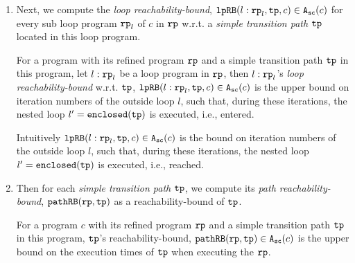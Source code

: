 \begin{enumerate}
  \item  Next, we compute the \emph{loop reachability-bound},
        $\mathtt{lpRB}(l: \mathtt{rp}_l, \mathtt{tp}, c) \in {\ensuremath{\mathtt{A_{sc}}}}(c)$ for every sub loop program $\mathtt{rp}_l$ of $c$ in $\mathtt{rp}$ w.r.t. a \emph{simple transition path} $\mathtt{tp}$ located in this loop program.
      \begin{defn}
        For a program with its refined program $\mathtt{rp}$ and a simple transition path $\mathtt{tp}$ in this program, 
        let $l: \mathtt{rp}_l$ be a loop program in $\mathtt{rp}$,
        then $l: \mathtt{rp}_l$'s \emph{loop reachability-bound} w.r.t. $\mathtt{tp}$,  $\mathtt{lpRB}(l: \mathtt{rp}_l, \mathtt{tp}, c) \in {\ensuremath{\mathtt{A_{sc}}}}(c)$
        is the upper bound on iteration numbers of the outside loop $l$,
        such that,
        during these iterations, the nested loop $l' = \mathtt{enclosed(\mathtt{tp})}$ is executed, i.e., entered.
      \end{defn}
        Intuitively $\mathtt{lpRB}(l: \mathtt{rp}_l, \mathtt{tp}, c) \in {\ensuremath{\mathtt{A_{sc}}}}(c)$
        is the bound on iteration numbers of the outside loop $l$,
        such that,
        during these iterations, the nested loop $l' = \mathtt{enclosed(\mathtt{tp})}$ is executed, i.e., reached.
      \item 
      Then for each \emph{simple transition path} $\mathtt{tp}$, we compute its \emph{path reachability-bound}, $\mathtt{pathRB}(\mathtt{rp}, \mathtt{tp})$ as a reachability-bound of $\mathtt{tp}$.
      \begin{defn}
        For a program $c$ with its refined program $\mathtt{rp}$ and a simple transition path $\mathtt{tp}$ in this program, 
        $\mathtt{tp}$'s reachability-bound, $\mathtt{pathRB}(\mathtt{rp}, \mathtt{tp}) \in {\ensuremath{\mathtt{A_{sc}}}}(c)$ is the upper bound on the
        execution times of $\mathtt{tp}$ when executing the $\mathtt{rp}$.

\end{defn}
\end{enumerate}
